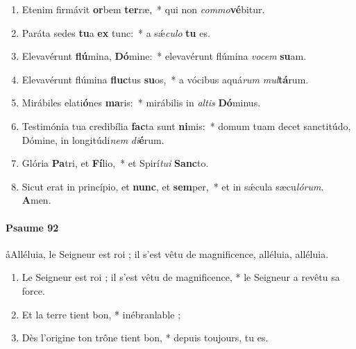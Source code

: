 \documentclass[twoside]{article}
\begin{document}
\begin{paracol}[1]{2}
\begin{enumerate}[wide, itemsep=0mm, labelwidth=!, labelindent=0pt, label=\color{gregoriocolor}\theenumi]
\item Etenim firmávit \textbf{or}bem \textbf{ter}ræ,~* qui non \textit{com}\textit{mo}\textbf{vé}bitur.

\item Paráta sedes \textbf{tu}a \textbf{ex} tunc:~* a sǽ\textit{cu}\textit{lo} \textbf{tu} es.

\item Elevavérunt \textbf{flú}mina, \textbf{Dó}mine:~* elevavérunt flúmina \textit{vo}\textit{cem} \textbf{su}am.

\item Elevavérunt flúmina \textbf{fluc}tus \textbf{su}os,~* a vócibus aquá\textit{rum} \textit{mul}\textbf{tá}rum.

\item Mirábiles elati\textbf{ó}nes \textbf{ma}ris:~* mirábilis in \textit{al}\textit{tis} \textbf{Dó}minus.

\item Testimónia tua credibília \textbf{fac}ta sunt \textbf{ni}mis:~* domum tuam decet sanctitúdo, Dómine, in longitúdi\textit{nem} \textit{di}\textbf{é}rum.

\item Glória \textbf{Pa}tri, et \textbf{Fí}lio,~* et Spirí\textit{tu}\textit{i} \textbf{Sanc}to.

\item Sicut erat in princípio, et \textbf{nunc}, et \textbf{sem}per,~* et in sǽcula sæcu\textit{ló}\textit{rum}. \textbf{A}men.
\end{enumerate}

\switchcolumn


\paragraph{Psaume 92}
\aa Alléluia, le Seigneur est roi ; il s'est vêtu de magnificence, alléluia, alléluia.


\begin{enumerate}[wide, itemsep=0mm, labelwidth=!, labelindent=0pt, label=\color{gregoriocolor}\theenumi]

\item Le Seigneur est roi ; il s'est vêtu de magnificence, *
le Seigneur a revêtu sa force.

\item Et la terre tient bon, * inébranlable ;

\item Dès l'origine ton trône tient bon, *
depuis toujours, tu es.


\end{enumerate}
\end{paracol}
\end{document}
